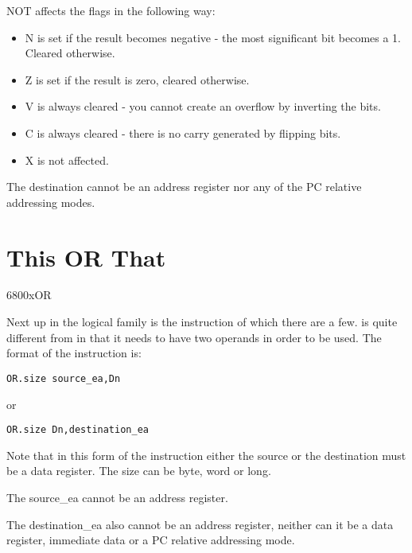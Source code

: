 NOT affects the flags in the following way:
\begin{itemize}[itemsep=0pt]

\item{}N is set if the result becomes negative -{} the most significant
        bit becomes a 1. Cleared otherwise.


\item{}Z is set if the result is zero, cleared otherwise.


\item{}V is always cleared -{} you cannot create an overflow by inverting
        the bits.


\item{}C is always cleared -{} there is no carry generated by flipping
        bits.


\item{}X is not affected.

\end{itemize}

The destination cannot be an address register nor any of the PC relative addressing modes.

\section{This OR That}\mc6800x{OR}
\label{ch4-or}%

Next up in the logical family is the  instruction of which there
    are a few.  is quite different from  in that it needs to have two
    operands in order to be used. The format of the  instruction is:

\begin{lstlisting}[firstnumber=1,]
          OR.size source_ea,Dn
\end{lstlisting}

or

\begin{lstlisting}[firstnumber=1,]
          OR.size Dn,destination_ea
\end{lstlisting}

Note that in this form of the instruction either the source or the
    destination must be a data register. The size can be byte, word or
    long.

\begin{warning}
The source\_ea cannot be an address register. 

The destination\_ea also cannot be an address register, neither can it be a data register, immediate data or a PC relative addressing mode. 
\end{warning}    

